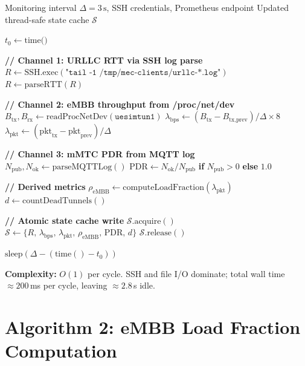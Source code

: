 \begin{algorithm}[H]
\caption{Monitoring Agent: Decoupled State Collection}
\label{alg:monitor}
\begin{algorithmic}[1]
\Require Monitoring interval $\Delta = 3\,\text{s}$, SSH credentials, Prometheus endpoint
\Ensure Updated thread-safe state cache $\mathcal{S}$

  \State $t_0 \gets \text{time()}$

  \State \textbf{// Channel 1: URLLC RTT via SSH log parse}
  \State $R \gets \text{SSH.exec}(\texttt{"tail -1 /tmp/mec-clients/urllc-*.log"})$
  \State $R \gets \text{parseRTT}(R)$ 

  \State \textbf{// Channel 2: eMBB throughput from /proc/net/dev}
  \State $B_{\text{tx}}, B_{\text{rx}} \gets \text{readProcNetDev}(\texttt{uesimtun1})$
  \State $\lambda_{\text{bps}} \gets (B_{\text{tx}} - B_{\text{tx,prev}}) / \Delta \times 8$
  \State $\lambda_{\text{pkt}} \gets (\text{pkt}_{\text{tx}} - \text{pkt}_{\text{prev}}) / \Delta$

  \State \textbf{// Channel 3: mMTC PDR from MQTT log}
  \State $N_{\text{pub}}, N_{\text{ok}} \gets \text{parseMQTTLog}()$
  \State $\text{PDR} \gets N_{\text{ok}} / N_{\text{pub}}$ \textbf{ if } $N_{\text{pub}} > 0$ \textbf{ else } $1.0$

  \State \textbf{// Derived metrics}
  \State $\rho_{\text{eMBB}} \gets \text{computeLoadFraction}(\lambda_{\text{pkt}})$ 
  \State $d \gets \text{countDeadTunnels}()$

  \State \textbf{// Atomic state cache write}
  \State $\mathcal{S}.\text{acquire}()$
  \State $\mathcal{S} \gets \{R,\, \lambda_{\text{bps}},\, \lambda_{\text{pkt}},\, \rho_{\text{eMBB}},\, \text{PDR},\, d\}$
  \State $\mathcal{S}.\text{release}()$

  \State $\text{sleep}(\Delta - (\text{time}() - t_0))$
\EndWhile
\end{algorithmic}
\end{algorithm}

\textbf{Complexity:} $O(1)$ per cycle. SSH and file I/O dominate; total wall time $\approx 200$\,ms per cycle, leaving $\approx 2.8$\,s idle.

\section{Algorithm 2: eMBB Load Fraction Computation}


